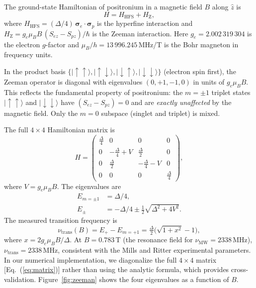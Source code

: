 \documentclass[twocolumn,pra,aps,superscriptaddress,floatfix,10pt]{revtex4-2}
\begin{document}
The ground-state Hamiltonian of positronium in a magnetic field $B$ along $\hat{z}$ is
\begin{equation}
  H = H_\mathrm{HFS} + H_\mathrm{Z},
  \label{eq:hamiltonian}
\end{equation}
where $H_\mathrm{HFS} = (\Delta/4)\,\bm{\sigma}_e \cdot \bm{\sigma}_p$ is the hyperfine interaction and $H_\mathrm{Z} = g_e \mu_B B \,(S_{ez} - S_{pz})/\hbar$ is the Zeeman interaction. Here $g_e = 2.002\,319\,304$ is the electron $g$-factor and $\mu_B/h = 13\,996.245$\,MHz/T is the Bohr magneton in frequency units.

In the product basis $\{|\!\uparrow\uparrow\rangle, |\!\uparrow\downarrow\rangle, |\!\downarrow\uparrow\rangle, |\!\downarrow\downarrow\rangle\}$ (electron spin first), the Zeeman operator is diagonal with eigenvalues $(0, +1, -1, 0)$ in units of $g_e\mu_B B$. This reflects the fundamental property of positronium: the $m = \pm 1$ triplet states $|\!\uparrow\uparrow\rangle$ and $|\!\downarrow\downarrow\rangle$ have $(S_{ez} - S_{pz}) = 0$ and are \emph{exactly unaffected} by the magnetic field. Only the $m = 0$ subspace (singlet and triplet) is mixed.

The full $4 \times 4$ Hamiltonian matrix is
\begin{equation}
  H = \begin{pmatrix}
    \frac{\Delta}{4} & 0 & 0 & 0 \\
    0 & -\frac{\Delta}{4} + V & \frac{\Delta}{2} & 0 \\
    0 & \frac{\Delta}{2} & -\frac{\Delta}{4} - V & 0 \\
    0 & 0 & 0 & \frac{\Delta}{4}
  \end{pmatrix},
  \label{eq:matrix}
\end{equation}
where $V = g_e \mu_B B$. The eigenvalues are
\begin{align}
  E_{m=\pm 1} &= \Delta/4, \label{eq:Em1} \\
  E_{\pm} &= -\Delta/4 \pm \tfrac{1}{2}\sqrt{\Delta^2 + 4V^2}. \label{eq:Epm}
\end{align}
The measured transition frequency is
\begin{equation}
  \nu_\mathrm{trans}(B) = E_+ - E_{m=+1} = \tfrac{\Delta}{2}\bigl(\sqrt{1 + x^2} - 1\bigr),
  \label{eq:nutrans}
\end{equation}
where $x = 2g_e\mu_B B/\Delta$. At $B = 0.783$\,T (the resonance field for $\nu_\mathrm{MW} = 2338$\,MHz), $\nu_\mathrm{trans} = 2338$\,MHz, consistent with the Mills and Ritter experimental parameters. In our numerical implementation, we diagonalize the full $4 \times 4$ matrix [Eq.~(\ref{eq:matrix})] rather than using the analytic formula, which provides cross-validation. Figure~\ref{fig:zeeman} shows the four eigenvalues as a function of $B$.
\end{document}
